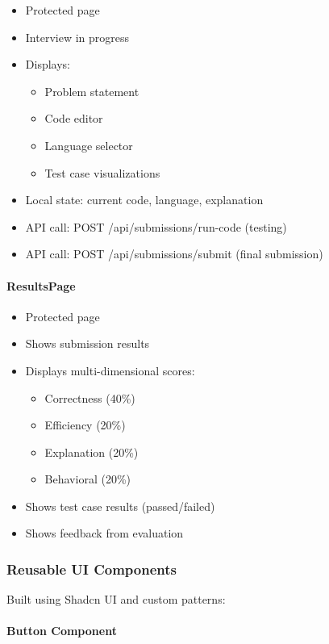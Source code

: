 \documentclass[12pt,a4paper,oneside]{article}
\begin{document}
\begin{itemize}
    \item Protected page
    \item Interview in progress
    \item Displays:
    \begin{itemize}
        \item Problem statement
        \item Code editor
        \item Language selector
        \item Test case visualizations
    \end{itemize}
    \item Local state: current code, language, explanation
    \item API call: POST /api/submissions/run-code (testing)
    \item API call: POST /api/submissions/submit (final submission)
\end{itemize}

\paragraph{ResultsPage}

\begin{itemize}
    \item Protected page
    \item Shows submission results
    \item Displays multi-dimensional scores:
    \begin{itemize}
        \item Correctness (40\%)
        \item Efficiency (20\%)
        \item Explanation (20\%)
        \item Behavioral (20\%)
    \end{itemize}
    \item Shows test case results (passed/failed)
    \item Shows feedback from evaluation
\end{itemize}

\subsubsection{Reusable UI Components}

Built using Shadcn UI and custom patterns:

\paragraph{Button Component}
\end{document}
